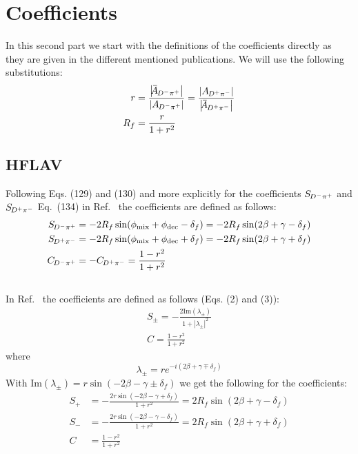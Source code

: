 \section{Coefficients}
\label{sec:coef}

In this second part we start with the definitions of the coefficients directly as they are given in the different mentioned publications.
We will use the following substitutions:
\begin{align*}
r &= \frac{\left|\overline{\kern -2.5pt A\kern -1.0pt}_{\kern 0.2pt D^{-}\pi^{+}}\right|}{\left|A_{\kern -0.8pt D^{-}\pi^{+}}\right|} = \frac{\left|A_{\kern -0.8pt D^{+}\pi^{-}}\right|}{\left|\overline{\kern -2.5pt A\kern -1.0pt}_{\kern 0.2pt D^{+}\pi^{-}}\right|}\\
R_f &= \frac{r}{1+r^2}
\end{align*}

\subsection{HFLAV}

Following Eqs. (129) and (130) and more explicitly for the coefficients $\mbox{\ensuremath{S_{\kern -0.8pt D^{-}\pi^{+}}}}$ and $\mbox{\ensuremath{S_{\kern -0.8pt D^{+}\pi^{-}}}}$ \mbox{Eq. (134)} in Ref.~\cite{Amhis:2016xyh} the \CP
coefficients are defined as follows:
\begin{align}
\mbox{\ensuremath{S_{\kern -0.8pt D^{-}\pi^{+}}}} &= -2R_f\sin\!\left(\phi_{\text{mix}}+\phi_{\text{dec}}-\delta_{f}\right) = -2R_f\sin\!\left(2\beta+\gamma-\delta_{f}\right)\\
\mbox{\ensuremath{S_{\kern -0.8pt D^{+}\pi^{-}}}} &= -2R_f\sin\!\left(\phi_{\text{mix}}+\phi_{\text{dec}}+\delta_{f}\right) = -2R_f\sin\!\left(2\beta+\gamma+\delta_{f}\right)\\
\mbox{\ensuremath{C_{\kern -0.8pt D^{-}\pi^{+}}}} &= -\mbox{\ensuremath{C_{\kern -0.8pt D^{+}\pi^{-}}}} = \frac{1-r^2}{1+r^2}
\end{align}

\subsection{\babar}

In Ref.~\cite{Aubert:2006tw} the \CP coefficients are defined as follows (Eqs. (2) and (3)):
\begin{align}
S_{\pm}=-\frac{2\text{Im}\left(\lambda_{\pm}\right)}{1+\left|\lambda_{\pm}\right|^2}\\
C=\frac{1-r^2}{1+r^2}
\end{align}
where
\begin{equation}
\lambda_\pm=r e^{-i\left(2\beta+\gamma\mp\delta_f\right)}
\end{equation}
With $\text{Im}\left(\lambda_\pm\right) = r\sin\!\left(-2\beta-\gamma\pm\delta_f\right)$ we get the following for the \CP coefficients:
\begin{align}
S_{+}&=-\frac{2r\sin\!\left(-2\beta-\gamma+\delta_f\right)}{1+r^2}=2R_f\sin\!\left(2\beta+\gamma-\delta_f\right)\\
S_{-}&=-\frac{2r\sin\!\left(-2\beta-\gamma-\delta_f\right)}{1+r^2}=2R_f\sin\!\left(2\beta+\gamma+\delta_f\right)\\
C&=\frac{1-r^2}{1+r^2}
\end{align}

